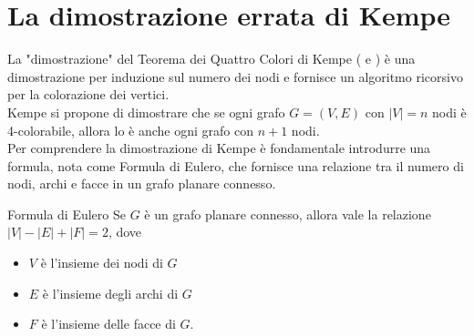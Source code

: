 \documentclass[a4paper,12pt,titlepage]{report}
\begin{document}
    \section{La dimostrazione errata di Kempe}
    La "dimostrazione" del Teorema dei Quattro Colori di Kempe ({\bfseries \cite{Kempe}} e {\bfseries \cite{Simonson}}) è una dimostrazione per induzione sul numero dei nodi e fornisce un algoritmo ricorsivo per la colorazione dei vertici.
    \\Kempe si propone di dimostrare che se ogni grafo $G = (V,E)$ con $\lvert V \rvert = n$ nodi è 4-colorabile, allora lo è anche ogni grafo con $n + 1$ nodi.
    \\Per comprendere la dimostrazione di Kempe è fondamentale introdurre una formula, nota come Formula di Eulero, che fornisce una relazione tra il numero di nodi, archi e facce in un grafo planare connesso.
    \begin{namedthm*}{Formula di Eulero}
    	Se $G$ è un grafo planare connesso, allora vale la relazione 
    	\\$\lvert V \rvert - \lvert E \rvert + \lvert F \rvert = 2$, dove
    	\begin{itemize}
    		\item $V$ è l'insieme dei nodi di $G$
    		\item $E$ è l'insieme degli archi di $G$
    		\item $F$ è l'insieme delle facce di $G$.
    	\end{itemize}
    \end{namedthm*}
\end{document}
